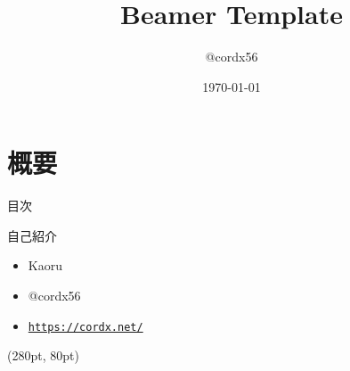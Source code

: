 \documentclass[12pt,dvipdfmx,uplatex,aspectratio=169]{beamer}
\title{Beamer Template}
\author{@cordx56}
\date{\today}
\institute{Institute}
\begin{document}
    \frame{\maketitle}

    \section{概要}
    \begin{frame}{目次}
        \tableofcontents
    \end{frame}
    \begin{frame}{自己紹介}
        \begin{itemize}
            \item \textrm{Kaoru}
            \item @cordx56
            \item \texttt{\href{https://cordx.net/}{https://cordx.net/}}
        \end{itemize}
        \begin{textblock*}{0.2\linewidth} (280pt, 80pt)
        \end{textblock*}
    \end{frame}
\end{document}
